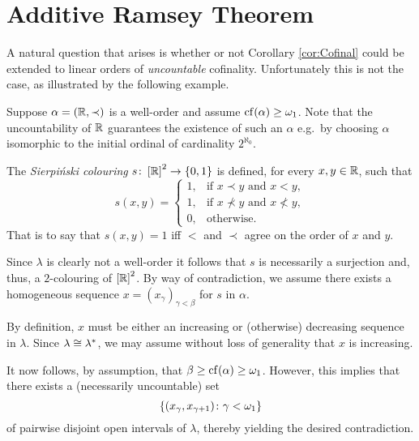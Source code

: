 \section{Additive Ramsey Theorem}

A natural question that arises is whether or not Corollary \ref{cor:Cofinal}
could be extended to linear orders of \textit{uncountable} cofinality.
Unfortunately this is not the case, as illustrated by the following example.

\begin{exm}
	Suppose $\alpha=(\mathbb{R},\prec)$ is a well-order and assume
	$\operatorname{cf}(\alpha)\geq\omega_1$.  Note that the uncountability of $\mathbb{R}$
	guarantees the existence of such an $\alpha$ e.g.\ by choosing $\alpha$
	isomorphic to the initial ordinal of cardinality $2^{\aleph_0}$.

	The \textit{Sierpi\'nski colouring} $s\colon\left[\mathbb{R}\right]^{2}\to\left\lbrace 0,1\right\rbrace$
	is defined, for every $x,y\in\mathbb{R}$, such that
	\begin{equation}
		s(x,y)=
		\begin{cases}
			1,  &\text{if }x\prec y\text{ and }x<y,\\
			1,  &\text{if }x\nprec y\text{ and }x\not< y,\\
			0,   &\text{otherwise.}
		\end{cases}
	\end{equation}
	That is to say that $s(x,y)=1$ iff $<$ and $\prec$ agree on the order of
	$x$ and $y$.

	Since $\lambda$ is clearly not a well-order it follows that $s$ is
	necessarily a surjection and, thus, a $2$-colouring of
	$\left[\mathbb{R}\right]^{2}$.  By way of contradiction, we assume there exists a
	homogeneous sequence $x=(x_{\gamma})_{\gamma<\beta}$ for $s$ in $\alpha$.

	By definition, $x$ must be either an increasing or (otherwise) decreasing
	sequence in $\lambda$.  Since $\lambda\cong{\lambda}^\ast$, we may assume
	without loss of generality that $x$ is increasing.

	It now follows, by assumption, that $\beta\geq\operatorname{cf}(\alpha)\geq\omega_1$.
	However, this implies that there exists a (necessarily uncountable) set
	\begin{equation}
		\left\lbrace (x_\gamma,x_{\gamma+1})\colon \gamma<\omega_1 \right\rbrace
	\end{equation}
	of pairwise disjoint open intervals of $\lambda$, thereby yielding the
	desired contradiction.
\end{exm}

